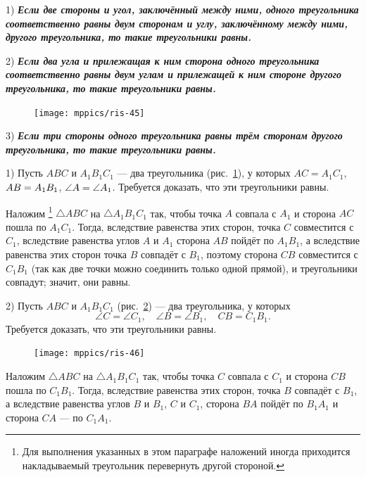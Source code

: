 \documentclass[oneside]{book}
\begin{document}
1) \textbf{\emph{Если две стороны и угол, заключённый
между ними, одного треугольника соответственно равны
двум сторонам и углу, заключённому между ними, другого треугольника, то такие треугольники равны.}}

2) \textbf{\emph{Если два угла и прилежащая к ним сторона одного треугольника соответственно равны двум углам и прилежащей к ним стороне другого треугольника, то такие треугольники равны.}}

\begin{figure}
\centering
\texttt{[image: mppics/ris-45]}
\caption{}\label{1938/ris-45}
\end{figure}


3) \textbf{\emph{Если три стороны одного треугольника равны трём сторонам другого треугольника, то такие треугольники равны.}}


1) Пусть $ABC$ и $A_1B_1C_1$ — два треугольника (рис.~\ref{1938/ris-45}), у которых
$AC=A_1C_1$, $AB \z= A_1B_1$, $\angle A \z= \angle A_1$.
Требуется доказать, что эти треугольники равны.

{\sloppy
Наложим%
\footnote{Для выполнения указанных в этом параграфе наложений иногда приходится накладываемый треугольник перевернуть другой стороной.} 
$\triangle ABC$ на $\triangle A_1B_1C_1$ так, чтобы точка $A$ совпала с $A_1$ и сторона $AC$ пошла по $A_1C_1$.
Тогда, вследствие равенства этих сторон, точка $C$ совместится с $C_1$, вследствие равенства углов $A$ и $A_1$ сторона $AB$ пойдёт по $A_1B_1$, а вследствие равенства этих сторон точка $B$ совпадёт с $B_1$, поэтому сторона $CB$ совместится с $C_1B_1$ (так как две точки можно соединить только одной прямой), и треугольники совпадут;
значит, они равны.

}

2) Пусть $ABC$ и $A_1B_1C_1$ (рис.~\ref{1938/ris-46}) — два треугольника, у которых
\[\angle C= \angle C_1,
\quad
\angle B=\angle B_1,
\quad
CB = C_1B_1.\]
Требуется доказать, что эти треугольники равны.

\begin{figure}
\centering
\texttt{[image: mppics/ris-46]}
\caption{}\label{1938/ris-46}
\end{figure}

Наложим $\triangle ABC$ на $\triangle A_1B_1C_1$ так, чтобы точка $C$ совпала с $C_1$ и сторона $CB$ пошла по $C_1B_1$.
Тогда, вследствие равенства этих сторон, точка $B$ совпадёт с $B_1$, а вследствие равенства углов $B$ и $B_1$, $C$ и $C_1$, сторона $BA$ пойдёт по $B_1A_1$ и сторона $CA$ — по $C_1A_1$.
\end{document}
